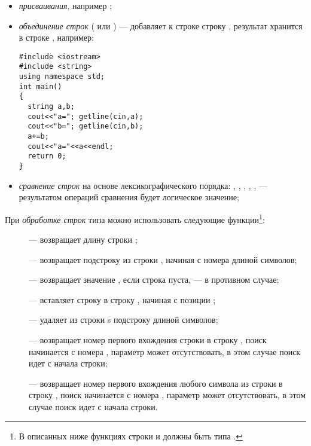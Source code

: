 \begin{itemize}
\item \emph{присваивания}, например ;
\item \emph{объединение строк} ( или ) --- добавляет к
строке  строку , результат хранится в строке , например:
\begin{lstlisting}
#include <iostream>
#include <string>
using namespace std;
int main()
{
  string a,b;
  cout<<"a="; getline(cin,a);
  cout<<"b="; getline(cin,b);
  a+=b;
  cout<<"a="<<a<<endl;
  return 0;
}
\end{lstlisting}

\item \emph{сравнение строк} на основе лексикографического порядка:
, ,
, , ,
 --- результатом операций сравнения будет логическое значение;
\end{itemize}
При \emph{обработке строк }типа  можно использовать следующие
функции\footnote{В описанных ниже функциях строки  и  должны быть типа .}:
\begin{description}
\item[] --- возвращает длину строки ;
\item[] --- возвращает подстроку из строки , начиная с номера
  длиной  символов;
\item[] --- возвращает значение , если строка  пуста,
 --- в противном случае;
\item[] --- вставляет строку  в строку , начиная с
позиции ;
\item[] --- удаляет из строки s подстроку  длиной
 символов;
\item[] --- возвращает номер первого вхождения строки  в строку
, поиск начинается с номера , параметр  может
отсутствовать, в этом случае поиск идет с начала строки;
\item[] --- возвращает номер первого вхождения любого символа из строки
 в строку , поиск начинается с номера , параметр
 может отсутствовать, в этом случае поиск идет с начала строки.
\end{description}

